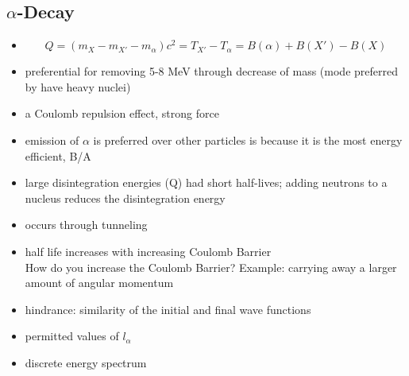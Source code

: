 \documentclass[letter]{article}
\begin{document}
\subsection{$\alpha$-Decay}
\begin{itemize}
\item \begin{equation}
Q = (m_{X}-m_{X'}-m_{\alpha})c^{2} = T_{X'}-T_{\alpha}=B(\alpha)+B(X')-B(X)
\end{equation}
\item preferential for removing 5-8 MeV through decrease of mass (mode preferred by have heavy nuclei)

\item a Coulomb repulsion effect, strong force

\item emission of $\alpha$ is preferred over other particles is because it is the most energy efficient, B/A

\item large disintegration energies (Q) had short half-lives; adding neutrons to a nucleus reduces the disintegration energy

\item occurs through tunneling

\item half life increases with increasing Coulomb Barrier\\
\hspace{20pt} How do you increase the Coulomb Barrier? Example: carrying away a larger amount of angular momentum

\item hindrance: similarity of the initial and final wave functions

\item permitted values of $l_{\alpha}$

\item discrete energy spectrum

\end{itemize}
\end{document}

